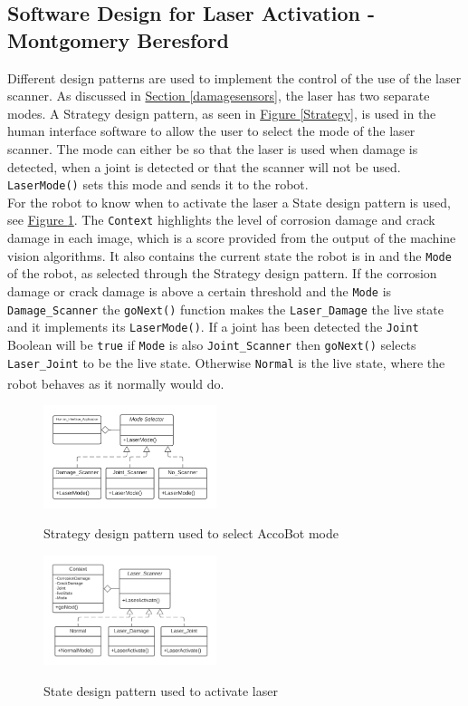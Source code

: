 \documentclass[11pt]{article}		%
\newcommand{\supercite}[1]{\textsuperscript{\cite{#1}}}		%
\newcommand{\figref}[1]{\hyperref[#1]{Figure \ref*{#1}}}    %
\newcommand{\sectref}[1]{\hyperref[#1]{Section \ref*{#1}}}     %
\begin{document}
	        \subsection[Software Design for Laser Activation]{Software Design for Laser Activation - Montgomery Beresford}
	         Different design patterns are used to implement the control of the use of the laser scanner. As discussed in \sectref{damagesensors}, the laser has two separate modes.
	        A Strategy design pattern, as seen in \figref{Strategy}, is used in the human interface software to allow the user to select the mode of the laser scanner. The mode can either be so that the laser is used when damage is detected, when a joint is detected or that the scanner will not be used. \verb|LaserMode()| sets this mode and sends it to the robot.	   \\
            \hspace*{2ex}For the robot to know when to activate the laser a State design pattern is used, see \figref{State}. The \verb|Context| highlights the level of corrosion damage and crack damage in each image, which is a score provided from the output of the machine vision algorithms. It also contains the current state the robot is in and the \verb|Mode| of the robot, as selected through the Strategy design pattern. If the corrosion damage or crack damage is above a certain threshold and the \verb|Mode| is \verb|Damage_Scanner| the \verb|goNext()| function makes the \verb|Laser_Damage| the live state and it implements its \verb|LaserMode()|. If a joint has been detected the \verb|Joint| Boolean will be \verb|true| if \verb|Mode| is also \verb|Joint_Scanner| then \verb|goNext()| selects \verb|Laser_Joint| to be the live state. Otherwise \verb|Normal| is the live state, where the robot behaves as it normally would do\supercite{Design_Patterns}.
	        
        	\begin{figure}[h]
				\centering
					\begin{multicols}{2}
					\includegraphics[width=0.45\textwidth]{Strategy_3YP_UML}
					\caption{Strategy design pattern used to select AccoBot mode}
					\label{Strategy}
			    	\columnbreak
					\includegraphics[width=0.45\textwidth]{State}
					\caption{State design pattern used to activate laser}
					\label{State}
					\end{multicols}
			\end{figure}	
			
\end{document}
